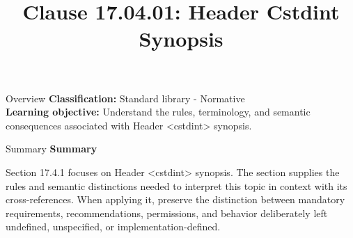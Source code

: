 \documentclass[10pt,letterpaper]{article}
\title{Clause 17.04.01: Header Cstdint Synopsis}
\author{}
\date{}
\begin{document}
\maketitle
\begin{CornellOverviewBox}{Overview}
\textbf{Classification:} Standard library - Normative\\[2pt]
\textbf{Learning objective:} Understand the rules, terminology, and semantic consequences associated with Header <cstdint> synopsis.
\end{CornellOverviewBox}\begin{CornellSummaryBox}{Summary}
{\sffamily\bfseries\color{Accent} Summary}\par\vspace{3pt}Section 17.4.1 focuses on Header <cstdint> synopsis. The section supplies the rules and semantic distinctions needed to interpret this topic in context with its cross-references. When applying it, preserve the distinction between mandatory requirements, recommendations, permissions, and behavior deliberately left undefined, unspecified, or implementation-defined.
\end{CornellSummaryBox}
\end{document}
